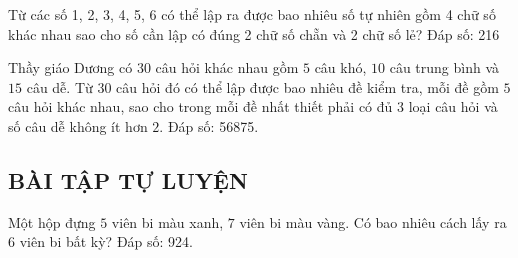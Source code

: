 \begin{vd}
	Từ các số 1, 2, 3, 4, 5, 6 có thể lập ra được bao nhiêu số tự nhiên gồm 4 chữ số khác nhau sao cho số cần lập có đúng 2 chữ số chẵn và 2 chữ số lẻ?
	\loigiai{}
	\hspace*{8cm} {\sf\fontsize{10pt}{1pt}\selectfont Đáp số: 216}
\end{vd} 

\begin{vd}
	Thầy giáo Dương có $30$ câu hỏi khác nhau gồm $5$ câu khó, $10$ câu trung bình và $15$ câu dễ. Từ $30$ câu hỏi đó có thể lập được bao nhiêu đề kiểm tra, mỗi đề gồm $5$ câu hỏi khác nhau, sao cho trong mỗi đề nhất thiết phải có đủ $3$ loại câu hỏi và số câu dễ không ít hơn $2$.
\hspace*{8cm} {\sf\fontsize{10pt}{1pt}\selectfont Đáp số: 56875.}
\end{vd} 

\subsection{BÀI TẬP TỰ LUYỆN}

\begin{baitap}
	Một hộp đựng $5$ viên bi màu xanh, $7$ viên bi màu vàng. Có bao nhiêu cách lấy ra $6$ viên bi bất kỳ?
	\hspace*{8cm} {\sf\fontsize{10pt}{1pt}\color{blue}\selectfont Đáp số: 924.}
\end{baitap} 


